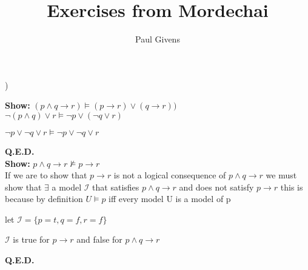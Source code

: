 \documentclass[letterpaper]{article}
\title{Exercises from Mordechai}
\author{Paul Givens}
\begin{document}
) 

\textbf{Show:}
$ (p \wedge q \rightarrow r) \vDash (p \rightarrow r) \vee (q \rightarrow r)) $
\\[1ex]

$ \neg (p \wedge q) \vee r \vDash \neg p \vee (\neg q \vee r) $

$ \neg p \vee \neg q \vee r \vDash \neg p \vee \neg q \vee r $ 

\textbf{Q.E.D.}
\\[1ex]

\textbf{Show:}
$ p \wedge q \rightarrow r \nvDash p \rightarrow r $
\\[1ex]

If we are to show that $ p \rightarrow r $ is not a logical consequence of
$ p \wedge q \rightarrow r $ we must show that $ \exists $ a model
$ \mathscr{I} $ that satisfies $ p \wedge q \rightarrow r $ and does not 
satisfy $ p \rightarrow r $ this is because by definition 
$ U \vDash p $ iff every model U is a model of p 

let $ \mathscr{I} = \{ p = t, q = f, r = f\}$ 

$ \mathscr{I} $ is true for $ p \rightarrow r $ and false for 
$ p \wedge q \rightarrow r $

\textbf{Q.E.D.}
\end{document}
